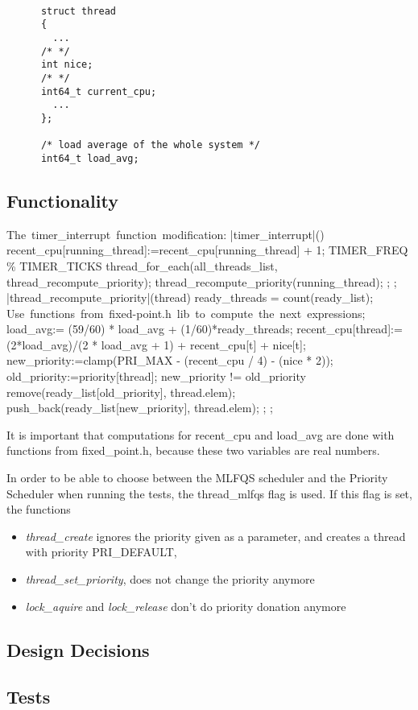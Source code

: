     \begin{lstlisting}

      struct thread
      {
	    ...
	  /* */
	  int nice;
	  /* */
	  int64_t current_cpu;  
	    ...
      };      

      /* load average of the whole system */
      int64_t load_avg;

    \end{lstlisting}


    \subsection{Functionality}

	\begin{program}
	\mbox{The timer\_interrupt function modification:}     
	\PROC |timer\_interrupt|() \BODY
		recent\_cpu[running\_thread]:=recent\_cpu[running\_thread] + 1;
		\IF TIMER\_FREQ \% TIMER\_TICKS  
		      \THEN thread\_for\_each(all\_threads\_list, thread\_recompute\_priority); 
		      \ELSE thread\_recompute\_priority(running\_thread);
		\FI;
	\END;
	\PROC |thread\_recompute\_priority|(thread) \BODY
		ready\_threads = count(ready\_list);
		\mbox{Use functions from fixed-point.h lib to compute the next expressions};
		load\_avg:= (59/60) * load\_avg + (1/60)*ready_threads; 
		recent\_cpu[thread]:= (2*load\_avg)/(2 * load\_avg + 1) + recent\_cpu[t] + nice[t];
		new\_priority:=clamp(PRI\_MAX - (recent\_cpu / 4) - (nice * 2));
		old\_priority:=priority[thread];
		\IF new\_priority != old\_priority
		      \THEN remove(ready\_list[old\_priority], thread.elem);
			    push\_back(ready\_list[new\_priority], thread.elem);
		\FI;
	\END;
	\end{program}

	It is important that computations for recent\_cpu and load\_avg are done with functions from fixed\_point.h, because these two variables are real numbers.

	In order to be able to choose between the MLFQS scheduler and the Priority Scheduler when running the tests, the thread\_mlfqs flag is used. If this flag is set, the functions 
	\begin{itemize}
	  \item \textit{thread\_create} ignores the priority given as a parameter, and creates a thread with priority PRI\_DEFAULT,
	  \item \textit{thread\_set\_priority}, does not change the priority anymore
	  \item \textit{lock\_aquire} and \textit{lock\_release} don't do priority donation anymore
	\end{itemize}

    \subsection{Design Decisions}


    \subsection{Tests}
